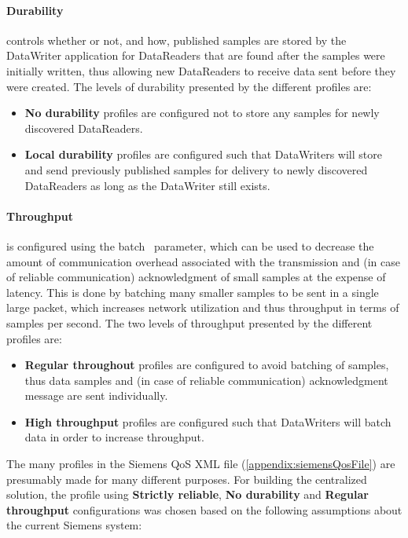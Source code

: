 \paragraph{Durability} controls whether or not, and how, published samples are stored by the DataWriter application for DataReaders that are found after the samples were initially written, thus allowing new DataReaders to receive data sent before they were created. The levels of durability presented by the different profiles are:

\begin{itemize}
	\item \textbf{No durability} profiles are configured not to store any samples for newly discovered DataReaders.
	\item \textbf{Local durability} profiles are configured such that DataWriters will store and send previously published samples for delivery to newly discovered DataReaders as long as the DataWriter still exists.
\end{itemize}

\paragraph{Throughput} is configured using the batch~\cite{rtiConnextUsersManual} parameter, which can be used to decrease the amount of communication overhead associated with the transmission and (in case of reliable communication) acknowledgment of small samples at the expense of latency. This is done by batching many smaller samples to be sent in a single large packet, which increases network utilization and thus throughput in terms of samples per second. The two levels of throughput presented by the different profiles are:

\begin{itemize}
	\item \textbf{Regular throughout} profiles are configured to avoid batching of samples, thus data samples and (in case of reliable communication) acknowledgment message are sent individually.
	\item \textbf{High throughput} profiles are configured such that DataWriters will batch data in order to increase throughput.
\end{itemize}

The many profiles in the Siemens QoS XML file (\cref{appendix:siemensQosFile}) are presumably made for many different purposes. For building the centralized solution, the profile using \textbf{Strictly reliable}, \textbf{No durability} and \textbf{Regular throughput} configurations was chosen based on the following assumptions about the current Siemens system:

